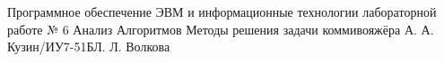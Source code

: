 \documentclass{bmstu}
\begin{document}

{Программное обеспечение ЭВМ и информационные технологии}
{лабораторной работе № 6}
{Анализ Алгоритмов}
{Методы решения задачи коммивояжёра}
{}{А. А. Кузин/ИУ7-51Б}{Л. Л. Волкова}


\renewcommand{\contentsname}{Содержание}
\tableofcontents
\setcounter{page}{2}






\makebibliography
\end{document}
